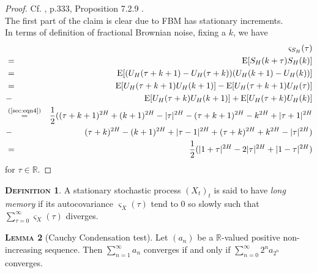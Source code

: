 \documentclass[a4paper, twoside, 11pt]{article}
\theoremstyle{definition}
\newtheorem{definition}{\scshape Definition}[section]
\newtheorem{lemma}[definition]{\scshape Lemma}
\begin{document}
\begin{proof}
  Cf. \cite{nourdin}, p.333, Proposition 7.2.9 .\\
  The first part of the claim is clear due to FBM has stationary increments.\\
  In terms of definition of fractional Brownian noise, fixing a $k$, we have
  \begin{eqnarray*}
	&&\varsigma_{S_H}(\tau)\\
	&=& \mathrm{E}[S_H(k+\tau)S_H(k)] \\
	&=& \mathrm{E}[(U_H(\tau+k+1) - U_H(\tau+k))(U_H(k+1)-U_H(k))]\\
	&=& \mathrm{E}[U_H(\tau+k+1)U_H(k+1)] - \mathrm{E}[U_H(\tau+k+1)U_H(\tau)] \\
	&-& \mathrm{E}[U_H(\tau+k)U_H(k+1)] + \mathrm{E}[U_H(\tau+k)U_H(k)]\\
	&\overset{\text{(\ref{sec:eqn4})}}{=}& \frac{1}{2} ( (\tau+k+1)^{2H} + (k+1)^{2H} - |\tau|^{2H} - (\tau+k+1)^{2H} - k^{2H} + |\tau+1|^{2H}\\
	&-& (\tau+k)^{2H} - (k+1)^{2H} + |\tau-1|^{2H}+ (\tau+k)^{2H} + k^{2H} - |\tau|^{2H})\\
	&=& \frac{1}{2}(|1+\tau|^{2H} - 2|\tau|^{2H} + |1-\tau|^{2H})
  \end{eqnarray*}
  for $\tau \in \mathbb{R}$.
\end{proof}


\begin{definition}
  A stationary stochastic process $(X_t)_t$ is said to have \emph{long memory} if its autocovariance $\varsigma_X(\tau)$ tend to $0$ so slowly such that
  $ \sum_{\tau = 0} ^{\infty} \varsigma_X(\tau)$ diverges.
\end{definition}

\begin{lemma}[Cauchy Condensation test]
  Let $(a_n)$ be a $\mathbb{R}$-valued positive non-increasing sequence. Then $\sum_{n=1}^{\infty} a_n$ converges if and only if $\sum_{n=0}^{\infty} 2^n a_{2^n}$ converges.
  \label{sec:cauchy}
\end{lemma}
\end{document}
